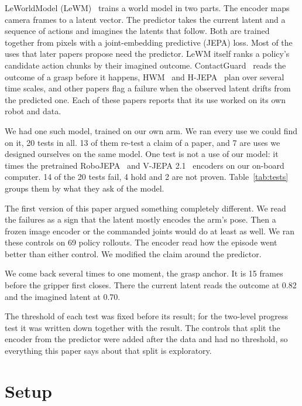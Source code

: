 \documentclass[10pt,twocolumn]{article}
\begin{document}
LeWorldModel (LeWM)~\citep{maes2026lewm} trains a world model in two parts. The encoder maps camera frames to a latent vector. The predictor takes the current latent and a sequence of actions and imagines the latents that follow. Both are trained together from pixels with a joint-embedding predictive (JEPA) loss. Most of the uses that later papers propose need the predictor. LeWM itself ranks a policy's candidate action chunks by their imagined outcome. ContactGuard~\citep{zheng2026contactguard} reads the outcome of a grasp before it happens, HWM~\citep{zhang2026hwm} and H-JEPA~\citep{zhang2026hjepa} plan over several time scales, and other papers flag a failure when the observed latent drifts from the predicted one. Each of these papers reports that its use worked on its own robot and data.


We had one such model, trained on our own arm. We ran every use we could find on it, 20 tests in all. 13 of them re-test a claim of a paper, and 7 are uses we designed ourselves on the same model. One test is not a use of our model: it times the pretrained RoboJEPA~\citep{zholus2026robojepa} and V-JEPA 2.1~\citep{murlabadia2026vjepa21} encoders on our on-board computer. 14 of the 20 tests fail, 4 hold and 2 are not proven. Table~\ref{tab:tests} groups them by what they ask of the model.


The first version of this paper argued something completely different. We read the failures as a sign that the latent mostly encodes the arm's pose. Then a frozen image encoder or the commanded joints would do at least as well. We ran these controls on 69 policy rollouts. The encoder read how the episode went better than either control. We modified the claim around the predictor.


We come back several times to one moment, the grasp anchor. It is 15 frames before the gripper first closes. There the current latent reads the outcome at 0.82 and the imagined latent at 0.70.


The threshold of each test was fixed before its result; for the two-level progress test it was written down together with the result. The controls that split the encoder from the predictor were added after the data and had no threshold, so everything this paper says about that split is exploratory.


\section{Setup}
\end{document}
